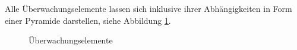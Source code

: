 Alle Überwachungselemente lassen sich inklusive ihrer Abhängigkeiten in Form einer Pyramide darstellen, siehe Abbildung \ref{moniele}.

\begin{figure}[ht]
	\centering
		\caption{Überwachungselemente}
		\label{moniele}
\end{figure}